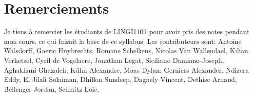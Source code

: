 \section*{Remerciements}

Je tiens à remercier les étudiants de LINGI1101 pour avoir pris des
notes pendant mon cours, ce qui faisait la base de ce syllabus.  Les
contributeurs sont:
Antoine Walsdorff,
Goeric Huybrechts,
Romane Schelkens,
Nicolas Van Wallendael, %
Kilian Verhetsel,
Cyril de Vogelaere,
Jonathan Legat, %
Siciliano Damiano-Joseph,
Aghakhani Ghazaleh,
Kühn Alexandre,
Maas Dylan, %
Gerniers Alexander,
Ndizera Eddy,
El Jilali Solaiman,
Dhillon Sundeep, %
Dagnely Vincent,
Dethise Arnaud,
Bellenger Jordan,
Schmitz Loic, %

